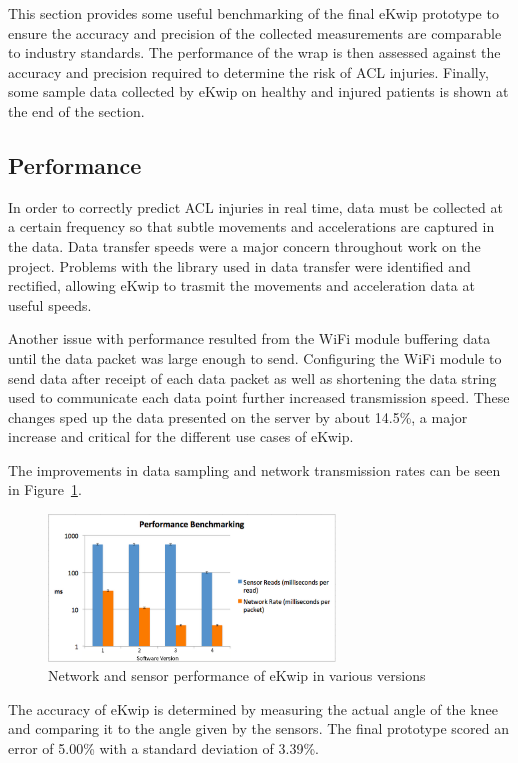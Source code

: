 This section provides some useful benchmarking of the final eKwip prototype to ensure the accuracy and precision of the collected measurements are comparable to industry standards. The performance of the wrap is then assessed against the accuracy and precision required to determine the risk of ACL injuries. Finally, some sample data collected by eKwip on healthy and injured patients is shown at the end of the section.

\subsection {Performance}
In order to correctly predict ACL injuries in real time, data must be collected at a certain frequency so that subtle movements and accelerations are captured in the data. Data transfer speeds were a major concern throughout work on the project. Problems with the library used in data transfer were identified and rectified, allowing eKwip to trasmit the movements and acceleration data at useful speeds.

Another issue with performance resulted from the WiFi module buffering data until the data packet was large enough to send.  Configuring the WiFi module to send data after receipt of each data packet as well as shortening the data string used to communicate each data point further increased transmission speed. These changes sped up the data presented on the server by about 14.5\%, a major increase and critical for the different use cases of eKwip. 

The improvements in data sampling and network transmission rates can be seen in Figure~\ref{fig:graph}.

\begin{figure}[h]
  \begin{center}
    \includegraphics[width=3in]{images/graph.png}
  \end{center}
  \caption{Network and sensor performance of eKwip in various versions}
  \label{fig:graph}
\end{figure}


The accuracy of eKwip is determined by measuring the actual angle of the knee and comparing it to the angle given by the sensors. The final prototype scored an error of 5.00\% with a standard deviation of 3.39\%. 

